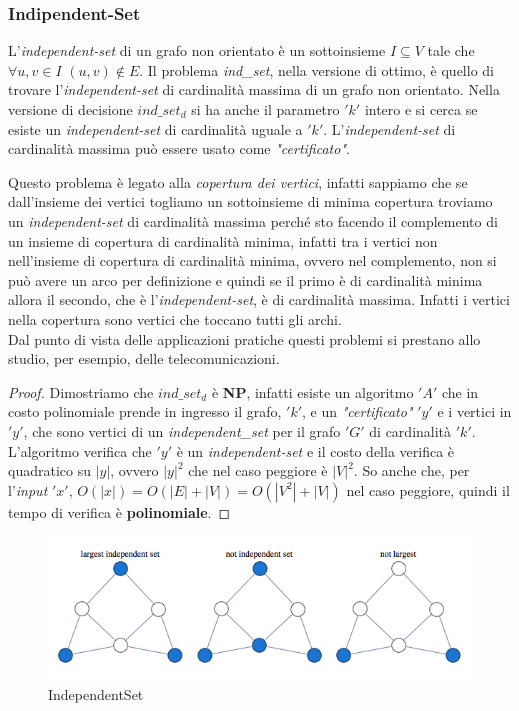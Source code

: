 			\subsubsection{Indipendent-Set}
			\begin{definizione}
				L'\textit{independent-set } di un grafo non orientato è un sottoinsieme
				$I\subseteq V$ tale che $\forall u,v\in I$ $(u,v)\not\in E$. Il problema
				\textit{ind\_set}, nella versione di ottimo, è quello di trovare
				l'\textit{independent-set} di cardinalità massima di un grafo non
				orientato. Nella versione di decisione $ind\_set_d$ si ha anche il parametro
				$ 'k' $ intero e si cerca se esiste un \textit{independent-set} di cardinalità
				uguale a $ 'k' $. L'\textit{independent-set} di cardinalità massima può essere
				usato come \textit{"certificato"}.
			\end{definizione}
			Questo problema è legato alla \textit{copertura dei vertici}, infatti sappiamo
			che se dall'insieme dei vertici togliamo un sottoinsieme di minima copertura
			troviamo un \textit{independent-set} di cardinalità massima perché sto facendo
			il complemento di un insieme di copertura di cardinalità minima, infatti tra i
			vertici non nell'insieme di copertura di cardinalità minima, ovvero nel
			complemento, non si può avere un arco per definizione e quindi se il primo è di
			cardinalità minima allora il secondo, che è l'\textit{independent-set}, è di
			cardinalità massima. Infatti i vertici nella copertura sono vertici che toccano
			tutti gli archi.\\
			Dal punto di vista delle applicazioni pratiche questi problemi si prestano allo
			studio, per esempio, delle telecomunicazioni.
			\begin{proof}
				Dimostriamo che $ind\_set_d$ è \textbf{NP}, infatti esiste un algoritmo $ 'A' $
				che in costo polinomiale prende in ingresso il grafo, $ 'k' $, e un
				\textit{"certificato"} $ 'y' $ e i vertici in $ 'y' $, che sono vertici di un
				\textit{independent\_set} per il grafo $ 'G' $ di cardinalità $ 'k' $. L'algoritmo
				verifica che $ 'y' $ è un \textit{independent-set} e il costo della verifica è
				quadratico su $|y|$, ovvero $|y|^2$ che nel caso peggiore è $|V|^2$. So anche
				che, per l'\textit{input} $ 'x' $, $O(|x|)=O(|E|+|V|)=O(|V^2|+|V|)$ nel caso peggiore,
				quindi il tempo di verifica è \textbf{polinomiale}.
			\end{proof}
			\begin{figure}[h!]
				\centering
				\includegraphics[width=1\textwidth]{img/independentSet.png}
				\caption{IndependentSet}
				\label{fig:IndependentSets}
			\end{figure}
